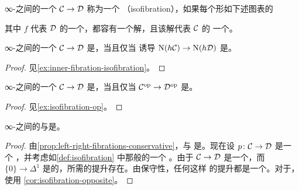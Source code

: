 \begin{definition}\label{def:isofibration}
∞-\trCategories{}之间的一个\trInnerFibration{} $\mathcal{C} \to \mathcal{D}$ 称为一个%
\emph{\trIsofibration{}}（isofibration），如果每个形如下述图表的\trLiftingProblem{}%
\begin{center}
\end{center}
其中 $f$ 代表 $\mathcal{D}$ 的一个\trEquivalence{}，都容有一个解，且该解代表 $\mathcal{C}$ 的
一个\trEquivalence{}。
\end{definition}

\begin{lemma}\label{lem:isofibration-homotopy-category}
∞-\trCategories{}之间的一个\trInnerFibration{} $\mathcal{C} \to \mathcal{D}$ 是\trIsofibration{}，当且仅当
诱导\trFunctor{} $\mathrm{N}(h\mathcal{C}) \to \mathrm{N}(h\mathcal{D})$ 是\trIsofibration{}。
\end{lemma}

\begin{proof}
见\cref{ex:inner-fibration-isofibration}。
\end{proof}

\begin{corollary}\label{cor:isofibration-opposite}
∞-\trCategories{}之间的一个\trFunctor{} $\mathcal{C} \to \mathcal{D}$ 是\trIsofibration{}，当且仅当
$\mathcal{C}^{\mathrm{op}} \to \mathcal{D}^{\mathrm{op}}$ 是\trIsofibration{}。
\end{corollary}

\begin{proof}
见\cref{ex:isofibration-op}。
\end{proof}

\begin{proposition}\label{prop:left-right-fibrations-conservative-isofibrations}
∞-\trCategories{}之间的\trLeftFibration{}与\trRightFibration{}是\trConservative{}\trIsofibration{}。
\end{proposition}

\begin{proof}
由\cref{prop:left-right-fibrations-conservative}，\trLeftFibration{}与%
\trRightFibration{}是\trConservative{}。现在设 $p\colon \mathcal{C} \to \mathcal{D}$ 是一个%
\trLeftFibration{}，并考虑如\cref{def:isofibration} 中那般的一个%
\trLiftingProblem{}。由于 $\mathcal{C} \to \mathcal{D}$ 是一个\trLeftFibration{}，而
$\{0\} \to \Delta^1$ 是\trLeftAnodyne{}的，所需的提升存在。由保守性，任何这样
的提升都是一个\trEquivalence{}。对于\trRightFibration{}，使用%
\cref{cor:isofibration-opposite}。
\end{proof}

